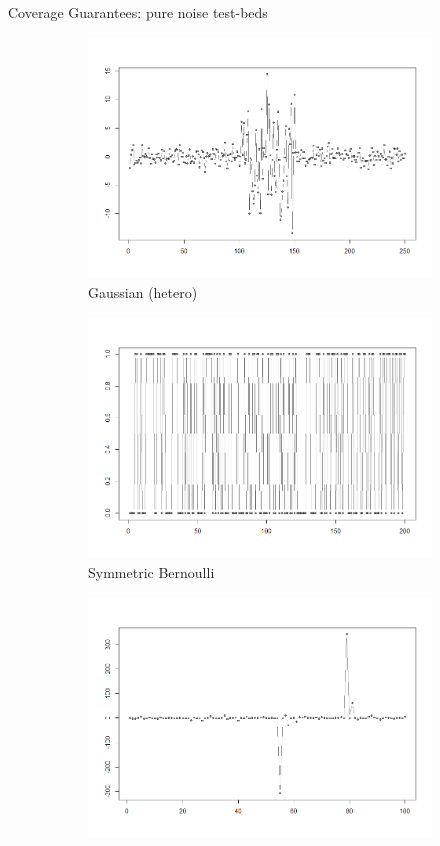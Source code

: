 \documentclass{beamer}
\begin{document}
\begin{frame}{Coverage Guarantees: pure noise test-beds}
\begin{figure}
\begin{subfigure}[b]{0.3\textwidth}
    \includegraphics[width=\textwidth]{../plots/hetero-gauss}
    \caption{Gaussian (hetero)}
\end{subfigure}
\begin{subfigure}[b]{0.3\textwidth}
    \centering
    \includegraphics[width=\textwidth]{../plots/sym-bern}
    \caption{Symmetric Bernoulli}
\end{subfigure}
\begin{subfigure}[b]{0.3\textwidth}
    \centering
    \includegraphics[width=\textwidth]{../plots/plain-cauchy}

\end{subfigure}
\end{figure}
\end{frame}
\end{document}
